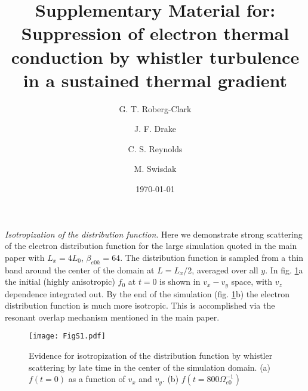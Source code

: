 \documentclass[%
 reprint,
superscriptaddress,
 amsmath,amssymb,
 aps,
]{revtex4-1}
\begin{document}

\title{Supplementary Material for: Suppression of electron thermal conduction by whistler turbulence in a sustained thermal gradient}

\author{G. T. Roberg-Clark}
\author{J. F. Drake}%
\author{C. S. Reynolds}%
\author{M. Swisdak}%

\date{\today}

\maketitle

\textit{Isotropization of the distribution function}. Here we demonstrate strong scattering of the electron distribution function for the large simulation quoted in the main paper with $L_{x}=4 L_{0}$, $\beta_{e0h}=64$. The distribution function is sampled from a thin band around the center of the domain at $L=L_{x}/2$, averaged over all $y$. In fig. \ref{fig:S1}a the initial (highly anisotropic) $f_{0}$ at $t=0$ is shown in $v_{x} - v_{y}$ space, with $v_{z}$ dependence integrated out. By the end of the simulation (fig. \ref{fig:S1}b) the electron distribution function is much more isotropic. This is accomplished via the resonant overlap mechanism mentioned in the main paper.

\renewcommand{\thefigure}{S\arabic{figure}}

\begin{figure}[b]
    \centering
    \texttt{[image: FigS1.pdf]}
    \caption{Evidence for isotropization of the distribution function by whistler scattering by late time in the center of the simulation domain. (a) $f(t=0)$ as a function of $v_{x}$ and $v_{y}$. (b) $f(t=800\Omega_{e0}^{-1})$ }
    \label{fig:S1}
\end{figure}
\end{document}
